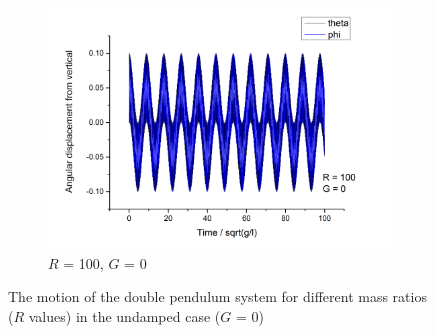 \documentclass[11pt]{article}
\begin{document}
\begin{figure}[h!]
\begin{subfigure}[h]{0.5\textwidth}
    \includegraphics[width=\textwidth]{img/dp/R=100_G=0.png}
    \captionsetup{width=0.85\textwidth}
    \caption{$R$ = 100, $G$ = 0}
    \label{fig:dp_R1_G0}
  \end{subfigure}
  \caption{The motion of the double pendulum system for different mass ratios ($R$ values) in the undamped case ($G$ = 0)}
\end{figure}
\end{document}
